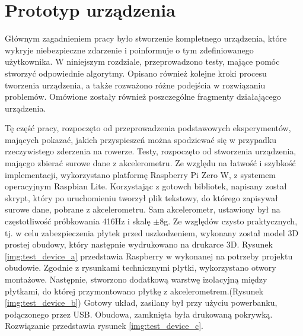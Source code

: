 \chapter{Prototyp urządzenia}
\label{cha:prototyp}

Głównym zagadnieniem pracy było stworzenie kompletnego urządzenia, które wykryje niebezpieczne zdarzenie i poinformuje o tym zdefiniowanego użytkownika. W niniejszym rozdziale, przeprowadzono testy, mające pomóc stworzyć odpowiednie algorytmy. Opisano również kolejne kroki procesu tworzenia urządzenia, a także rozważono różne podejścia w rozwiązaniu problemów. Omówione zostały również poszczególne fragmenty działającego urządzenia.

Tę część pracy, rozpoczęto od przeprowadzenia podstawowych eksperymentów, mających pokazać, jakich przyspieszeń można spodziewać się w przypadku rzeczywistego zderzenia na rowerze. Testy, rozpoczęto od stworzenia urządzenia, mającgo zbierać surowe dane z akcelerometru. Ze względu na łatwość i szybkość implementacji, wykorzystano platformę Raspberry Pi Zero W, z systemem operacyjnym Raspbian Lite. Korzystając z gotowch bibliotek, napisany został skrypt, który po uruchomieniu tworzył plik tekstowy, do którego zapisywał surowe dane, pobrane z akcelerometru. Sam akcelerometr, ustawiony był na częstotliwość próbkowania 416Hz i skalę $\pm$8g.
\newline
Ze względów czysto praktycznych, tj. w celu zabezpieczenia płytek przed uszkodzeniem, wykonany został model 3D prostej obudowy, który następnie wydrukowano na drukarce 3D. Rysunek \ref{img:test_device_a} przedstawia Raspberry w wykonanej na potrzeby projektu obudowie. Zgodnie z rysunkami technicznymi płytki, wykorzystano otwory montażowe. Następnie, stworzono dodatkową warstwę izolacyjną między płytkami, do której przymontowano płytkę z akcelerometrem.(Rysunek \ref{img:test_device_b}) Gotowy układ, zasilany był przy użyciu powerbanku, połączonego przez USB. Obudowa, zamknięta była drukowaną pokrywką. Rozwiązanie przedstawia rysunek \ref{img:test_device_c}.
\newline


